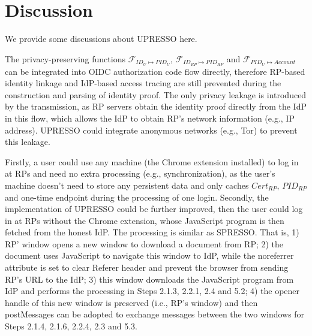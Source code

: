 \section{Discussion}
\label{sec:discussion}
We provide some discussions about UPRESSO here.

 The privacy-preserving functions $\mathcal{F}_{ID_{U} \mapsto PID_{U}}$, $\mathcal{F}_{ID_{RP} \mapsto PID_{RP}}$ and $\mathcal{F}_{PID_{U} \mapsto Account}$ can be integrated into OIDC authorization code flow directly, therefore  RP-based identity linkage and IdP-based access tracing are still prevented during the construction and parsing of identity proof.
The only privacy leakage is introduced by the transmission, as RP servers obtain the identity proof directly from the IdP in this flow, which allows the IdP to obtain RP's network information (e.g., IP address).
UPRESSO could integrate anonymous networks (e.g., Tor)  to prevent this leakage.



Firstly, a user could use any machine (the Chrome extension installed) to log in at RPs and need no extra processing (e.g., synchronization),
as the user's machine doesn't need to store any persistent data and only caches $Cert_{RP}$, $PID_{RP}$ and one-time endpoint during the processing of one login.
Secondly, the implementation of UPRESSO could  be further improved, then the user could  log in at RPs without the Chrome extension, whose JavaScript program is then fetched from the honest IdP. The processing is similar as SPRESSO. That is, 1) RP' window opens a new window to download a document from RP; 2) the document uses JavaScript to navigate this window to IdP, while the noreferrer attribute is set to clear Referer header and prevent the browser from sending RP's URL to the IdP; 3) this window downloads the  JavaScript  program from IdP and performs the processing in Steps 2.1.3, 2.2.1, 2.4 and 5.2; 4) the opener handle of this new window is preserved (i.e., RP's window) and then postMessages can be adopted to exchange messages between the two windows for Steps 2.1.4, 2.1.6, 2.2.4, 2.3 and 5.3.



